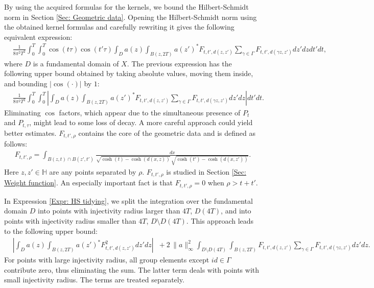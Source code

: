 \documentclass[11pt,twoside,reqno]{amsart} \usepackage{a4wide} \usepackage[T1]{fontenc} \usepackage[utf8]{inputenc} \usepackage{soul}  \usepackage{amsmath} \usepackage{amsfonts} \usepackage{amssymb} \usepackage{mathtools} \usepackage{amsthm} \usepackage{xcolor} \usepackage{graphicx} \usepackage{hyperref} \usepackage{standalone} \usepackage{esint} \usepackage{comment} \usepackage[left=2.3cm,top=3cm,right=2.3cm]{geometry} \usepackage{bm} \usepackage{svg} \usepackage{float} \numberwithin{equation}{section} \theoremstyle{plain} \newtheorem{thm}{Theorem}[section] \newtheorem{theorem}[thm]{Theorem} \newtheorem*{theorem*}{Theorem}\newtheorem{conj}[thm]{Conjecture} \newtheorem{lemma}[thm]{Lemma} \newtheorem{prop}[thm]{Proposition} \newtheorem{proposition}[thm]{Proposition} \newtheorem{cor}[thm]{Corollary} \newtheorem{question}[thm]{Question} \newtheorem{corollary}[thm]{Corollary} \newtheorem{assumption}[thm]{Assumption} \theoremstyle{definition} \newtheorem{defn}[thm]{Definition} \newtheorem{choice}[thm]{Choice} \newtheorem{definition}[thm]{Definition} \newtheorem{ex}[thm]{Example} \newtheorem{notation}[thm]{Notation} \newtheorem*{ack}{Acknowledgements} \theoremstyle{remark} \newtheorem{remark}[thm]{Remark} \newtheorem{bigremark}[thm]{Remark} \usepackage{xcolor} \newcommand{\red}[1]{ {\color{Red}#1} } \newcommand{\blue}[1]{ {\color{Blue}#1} } \author{Kai Hippi} \address{Aalto University, Espoo, Finland} \email{kai.hippi@aalto.fi}
\begin{document}
By using the acquired formulas for the kernels, we bound the Hilbert-Schmidt norm in Section \ref{Sec: Geometric data}. Opening the Hilbert-Schmidt norm using the obtained kernel formulas and carefully rewriting it gives the following equivalent expression:
\begin{align*}
	&
	\frac{1}{8 \pi^{2} T^{2}} \int_{0}^{T} \int_{0}^{T} \cos( t \tau ) \cos( t' \tau ) \int_{D} a(z) \int_{ B( z,2T ) } a( z' )^{*} F_{t,t', d( z,z' )} \sum_{\gamma \in \Gamma}^{} F_{t,t',d( \gamma z,z' )} dz' dz dt' dt,	
\end{align*}
where $ D $ is a fundamental domain of $ X $. The previous expression has the following upper bound obtained by taking absolute values, moving them inside, and bounding $ | \cos( \cdot ) | $ by $ 1 $:
\begin{align}
	&
	\label{Expr: HS tidying}
	\frac{1}{8 \pi^{2} T^{2}} \int_{0}^{T} \int_{0}^{T} \left| \int_{D} a(z) \int_{ B( z,2T ) } a( z' )^{*} F_{t,t', d( z,z' )} \sum_{\gamma \in \Gamma}^{} F_{t,t',d( \gamma z,z' )} dz' dz \right| dt' dt.
\end{align}
Eliminating $\cos$ factors, which appear due to the simultaneous presence of $P_{t}$ and $P_{t,\tau}$, might lead to some loss of decay. A more careful approach could yield better estimates. $ F_{t,t',\rho} $ contains the core of the geometric data and is defined as follows:
\begin{align*}
	F_{t,t',\rho} =  \int_{ B( z,t ) \cap B( z',t' ) } \frac{dx}{ \sqrt{ \cosh( t ) - \cosh( d( x,z ) ) } \, \sqrt{ \cosh( t' ) - \cosh( d( x,z' ) ) }  }.
\end{align*}
Here $ z,z' \in \mathbb{H} $ are any points separated by $ \rho $. $ F_{t,t',\rho} $ is studied in Section \ref{Sec: Weight function}. An especially important fact is that $ F_{t,t', \rho} = 0 $ when $ \rho > t + t' $.

In Expression \eqref{Expr: HS tidying}, we split the integration over the fundamental domain $ D $ into points with injectivity radius larger than $ 4T $, $ D( 4T ) $, and into points with injectivity radius smaller than $ 4T $, $ D \setminus D( 4T ) $. This approach leads to the following upper bound:
\begin{align}
	&
	\label{Expr: IR split}
	\left| \int_{D} a( z ) \int_{ B( z, 2T ) } a( z' )^{*}   F_{t,t', d( z,z' )}^{2}   dz' dz \right| 
	&
	+ \ 2 \, \|a \|_{\infty}^{2} \int_{D \setminus D( 4T )} \int_{ B( z, 2T ) }  F_{t,t', d( z,z' )}  \sum_{\gamma \in \Gamma}^{} F_{t,t', d( \gamma z, z' )} dz' dz.
\end{align}
For points with large injectivity radius, all group elements except $ id \in \Gamma $ contribute zero, thus eliminating the sum. The latter term deals with points with small injectivity radius. The terms are treated separately.
\end{document}
